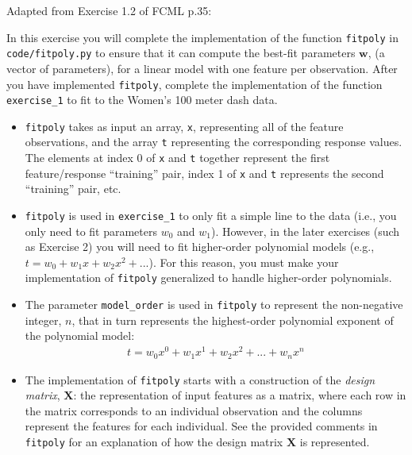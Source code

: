 \documentclass[10pt]{article}
\begin{document}
\newpage
\begin{itemize}



{\bf \large
\vspace{20pt}\item[1.] [5 points]
Adapted from Exercise 1.2 of FCML p.35:}

\normalsize In this exercise you will complete the implementation of the
function {\tt fitpoly} in \verb|code/fitpoly.py| to ensure that it can compute the best-fit parameters $\mathbf{w}$, (a vector of parameters), for a linear model with one feature per observation. After you have implemented {\tt fitpoly}, complete the implementation of the function {\tt exercise\_1} to fit to the Women's 100 meter dash data.

\begin{itemize}
\item {\tt fitpoly} takes as input an array, {\tt x}, representing all of the feature observations, and the array {\tt t} representing the corresponding response values. The elements at index 0 of {\tt x} and {\tt t} together represent the first feature/response ``training'' pair, index 1 of {\tt x} and {\tt t} represents the second ``training'' pair, etc.

\item {\tt fitpoly} is used in {\tt exercise\_1} to only fit a simple line to the data (i.e., you only need to fit parameters $w_0$ and $w_1$). However, in the later exercises (such as Exercise 2) you will need to fit higher-order polynomial models (e.g., $t = w_0 + w_1x + w_2x^2 + ...$). For this reason, you must make your implementation of {\tt fitpoly} generalized to handle higher-order polynomials.

\item The parameter {\tt model\_order} is used in {\tt fitpoly} to represent the non-negative integer, $n$, that in turn represents the highest-order polynomial exponent of the polynomial model:
\begin{eqnarray*}
t = w_0 x^0 + w_1 x^1 + w_2 x^2 + ... + w_n x^n
\end{eqnarray*}

\item The implementation of {\tt fitpoly} starts with a construction of the {\em design matrix}, $\mathbf{X}$: the representation of input features as a matrix, where each row in the matrix corresponds to an individual observation and the columns represent the features for each individual. See the provided comments in {\tt fitpoly} for an explanation of how the design matrix $\mathbf{X}$ is represented.
\end{itemize}


\end{itemize}
\end{document}
